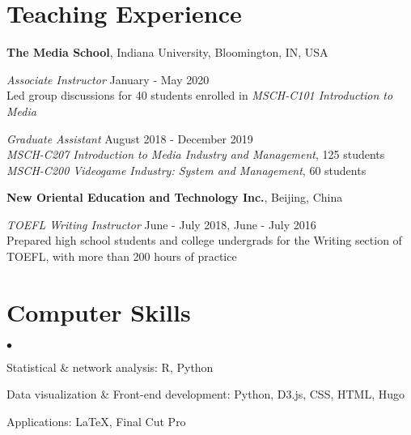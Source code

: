 \documentclass[margin,line, 10pt]{res}
\newenvironment{list2}{
  \begin{list}{$\bullet$}{%
      \setlength{\itemsep}{0in}
      \setlength{\parsep}{0in} \setlength{\parskip}{0in}
      \setlength{\topsep}{0in} \setlength{\partopsep}{0in} 
      \setlength{\leftmargin}{0.2in}}}{\end{list}}
\begin{document}
\begin{resume}
\section{\sc Teaching Experience}
{\bf The Media School}, Indiana University, Bloomington, IN, USA

\vspace{-.3cm}
{\em Associate Instructor} \hfill {January - May 2020}\\
Led group discussions for 40 students enrolled in \textit {MSCH-C101 Introduction to Media}

{\em Graduate Assistant} \hfill {August 2018 - December 2019}\\
\textit{MSCH-C207 Introduction to Media Industry and Management}, 125 students \\
\textit{MSCH-C200 Videogame Industry: System and Management}, 60 students

{\bf New Oriental Education and Technology Inc.}, Beijing, China

\vspace{-.3cm}
{\em TOEFL Writing Instructor} \hfill {June - July 2018, June - July 2016}\\
Prepared high school students and college undergrads for the Writing section of TOEFL, with more than 200 hours of practice

\section{\sc Computer Skills} 
\begin{list2}
\item Statistical \& network analysis:  R, Python
\item Data visualization \& Front-end development:  Python, D3.js, CSS, HTML, Hugo
\item Applications: \LaTeX, Final Cut Pro
\end{list2}

\end{resume}
\thispagestyle{lastpage}
\end{document}
